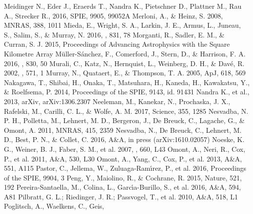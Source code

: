 \documentclass{pasa}%
\begin{document}
\begin{thebibliography}{}
   Meidinger N., Eder J., Eraerds T.,
    Nandra K., Pietschner D., Plattner M., Rau A., Strecker R., 2016, SPIE,
    9905, 99052A 
   Merloni, A., \& Heinz, S. 2008,
    MNRAS, 388, 1011
   Mieda, E., Wright, S. A., Larkin, J. E.,
    Armus, L., Juneau, S., Salim, S., \& Murray, N. 2016, \apj, 831, 78
   Morganti, R., Sadler, E. M., \&
    Curran, S. J. 2015, Proceedings of Advancing Astrophysics with the Square
    Kilometre Array 
   M\"uller-S\'anchez, F.,
    Comerford, J., Stern, D., \& Harrison, F. A. 2016, \apj, 830, 50
   Murali, C., Katz, N., Hernquist, L.,
    Weinberg, D. H., \& Dav\'e, R. 2002, \apj, 571, 1
   Murray, N., Quataert, E., \& Thompson,
    T. A. 2005, ApJ, 618, 569
   Nakagawa, T., Shibai, H., Onaka, T.,
    Matsuhara, H., Kaneda, H., Kawakatsu, Y., \& Roelfsema, P. 2014,
    Proceedings of the SPIE, 9143, id. 91431 
   Nandra K., et al., 2013, arXiv,
    arXiv:1306.2307
   Neeleman, M., Kanekar, N., Prochaska,
    J. X., Rafelski, M., Carilli, C. L., \& Wolfe, A. M. 2017, Science, 355,
    1285 
   Nesvadba, N. P. H., Polletta, M.,
    Lehnert, M. D., Bergeron, J., De Breuck, C., Lagache, G., \& Omont,
    A. 2011, MNRAS, 415, 2359
   Nesvadba, N., De Breuck, C., Lehnert,
    M. D., Best, P. N., \& Collet, C. 2016, A\&A, in press (arXiv:1610.02057)
   Noeske, K. G., Weiner, B. J., Faber,
    S. M., et al. 2007, \apj, 660, L43
   Omont, A., Neri, R., Cox, P., et
    al. 2011, A\&A, 530, L30
   Omont, A., Yang, C., Cox, P., et
    al. 2013, A\&A, 551, A115 
   Pastor, C., Jellema, W.,
    Zuluaga-Ram\'{\i}rez, P., et al. 2016, Proceedings of the SPIE, 
    9904, 3 
   Peng, Y., Maiolino, R., \& Cochrane, R.
    2015, Nature, 521, 192
   Pereira-Santaella, M.,
    Colina, L., Garc\'{\i}a-Burillo, S., et al. 2016, A\&A, 594, A81
   Pilbratt, G. L.; Riedinger, J. R.;
    Passvogel, T., et al. 2010, A\&A, 518, L1
   Poglitsch, A., Waelkens, C., Geis,

\end{thebibliography}
\end{document}
